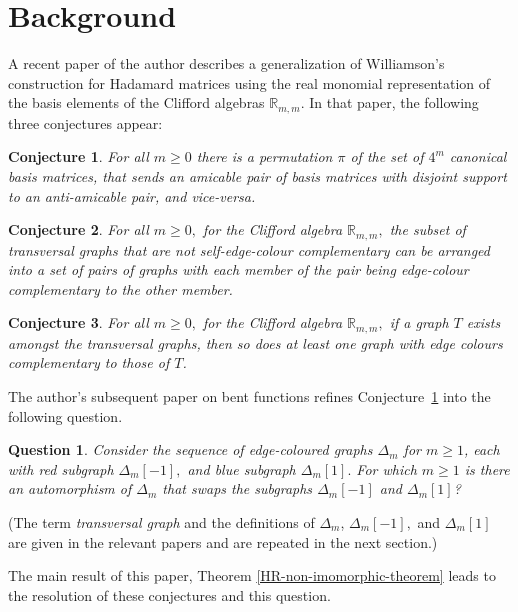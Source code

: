 \documentclass[12pt,a4paper]{article}
\newcommand{\mb}[1]{\mathbb{#1}}
\newcommand{\R}{\mb{R}}
\newtheorem{Conjecture}{Conjecture}
\newtheorem{Question}{Question}
\begin{document}
\section{Background}\label{sec-Background}
A recent paper of the author \cite{Leo14Constructions} describes a generalization of
Williamson's construction for Hada\-mard matrices \cite{Wil44}
using the real monomial representation of the basis elements of the Clifford algebras $\R_{m,m}$.
In that paper, the following three conjectures appear:

\begin{Conjecture}\label{conjecture-1}
%
For all $m \geqslant 0$ there is a permutation $\pi$ of the set of $4^m$ canonical basis matrices,
that sends an amicable pair of basis matrices with disjoint support to an anti-amicable pair, and vice-versa.
%
\end{Conjecture}

\begin{Conjecture}\label{conjecture-2}
%
For all $m \geqslant 0,$ 
for the Clifford algebra $\R_{m,m},$ the subset of transversal graphs that are 
not self-edge-colour complementary
can be arranged into a set of pairs of graphs with each member of the pair 
being edge-colour complementary to the other member.
%
\end{Conjecture}

\begin{Conjecture}\label{conjecture-3}
%
For all $m \geqslant 0,$ 
for the Clifford algebra $\R_{m,m},$ if a graph $T$ exists amongst the transversal graphs,
then so does at least one graph with edge colours complementary to those of $T$.
%
\end{Conjecture}

The author's subsequent paper on bent functions \cite{Leo15Twin} 
refines Conjecture~\ref{conjecture-1} into the following question.
\begin{Question}
\label{Question-1}
Consider the sequence of edge-coloured graphs $\varDelta_m$ for $m \geqslant 1$,
each with red subgraph $\varDelta_m[-1],$ and blue subgraph $\varDelta_m[1].$
For which $m \geqslant 1$ is there an automorphism of $\varDelta_m$ 
that swaps the subgraphs $\varDelta_m[-1]$ and $\varDelta_m[1]$?
\end{Question}
 
(The term \emph{transversal graph} and the definitions of $\varDelta_m$, $\varDelta_m[-1],$ and $\varDelta_m[1]$ 
are given in the relevant papers and are repeated in the next section.)

The main result of this paper, Theorem \ref{HR-non-imomorphic-theorem} leads to the resolution of these conjectures and this question.
\end{document}
